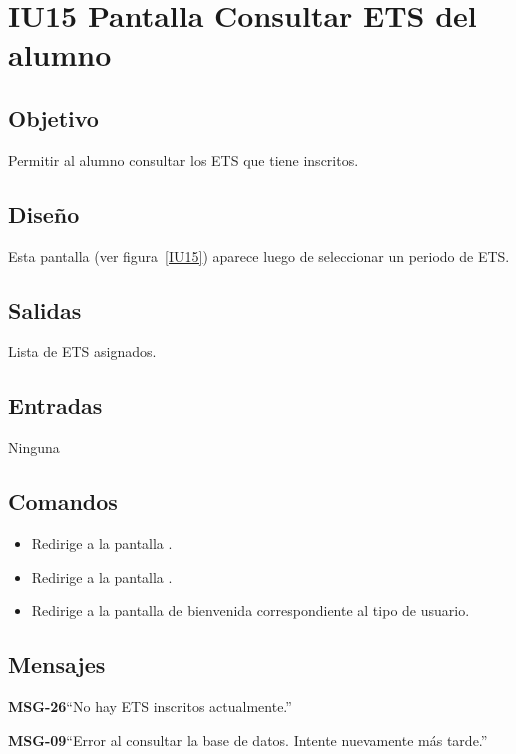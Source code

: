 \section{IU15 Pantalla Consultar ETS del alumno}

\subsection{Objetivo}
Permitir al alumno consultar los ETS que tiene inscritos. 

\subsection{Diseño}
Esta pantalla  (ver figura~\ref{IU15}) aparece luego de seleccionar un periodo de ETS. 


\subsection{Salidas}
Lista de ETS asignados. 

\subsection{Entradas}
Ninguna


\subsection{Comandos}

\begin{itemize}
	\item {} Redirige a la pantalla .
	\item {} Redirige a la pantalla .
	\item {} Redirige a la pantalla de bienvenida correspondiente al tipo de usuario.
\end{itemize}
\subsection{Mensajes}

\begin{Citemize}
	\item {\bf MSG-26}{``No hay ETS inscritos actualmente.''}
	\item {\bf MSG-09}{``Error al consultar la base de datos. Intente nuevamente más tarde.''}
\end{Citemize}
